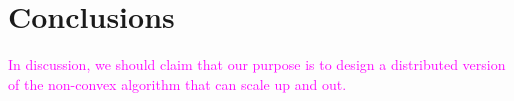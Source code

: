 \documentclass[letterpaper]{article} %
\begin{document}
\section{Conclusions}
\textcolor{magenta}{In discussion, we should claim that our purpose is to design a distributed version of the non-convex algorithm that can scale up and out.}



\end{document}
